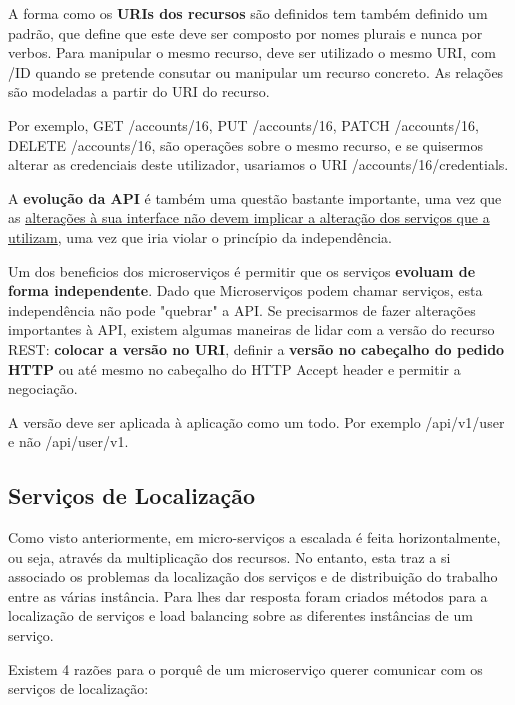 \documentclass{article}
\begin{document}
\vspace{2mm}

A forma como os \textbf{URIs dos recursos} são definidos tem também definido um padrão, que define
que este deve ser composto por nomes plurais e nunca por verbos. Para manipular o mesmo
recurso, deve ser utilizado o mesmo URI, com /ID quando se pretende consutar ou manipular
um recurso concreto. As relações são modeladas a partir do URI do recurso.

Por exemplo, GET /accounts/16, PUT /accounts/16,
PATCH /accounts/16, DELETE /accounts/16, são operações
sobre o mesmo recurso, e se quisermos alterar as credenciais
deste utilizador, usariamos o URI /accounts/16/credentials.

\vspace{2mm}

A \textbf{evolução da API} é também uma questão bastante importante, uma vez que as \uline{alterações à
sua interface não devem implicar a alteração dos serviços que a utilizam}, uma vez que iria
violar o princípio da independência.

Um dos beneficios dos microserviços é permitir que os serviços
\textbf{evoluam de forma independente}. Dado que Microserviços
podem chamar serviços, esta independência não pode
"quebrar" a API. Se precisarmos de fazer alterações importantes
à API, existem algumas maneiras de lidar com a versão do
recurso REST: \textbf{colocar a versão no URI}, definir a \textbf{versão no cabeçalho do pedido HTTP}
ou até mesmo no cabeçalho do HTTP Accept header e permitir a negociação.

A versão deve ser aplicada à aplicação como um todo. Por exemplo /api/v1/user e não /api/user/v1.

\subsection{Serviços de Localização}

Como visto anteriormente, em micro-serviços a escalada é feita horizontalmente, ou seja,
através da multiplicação dos recursos. No entanto, esta traz a si associado os problemas da
localização dos serviços e de distribuição do trabalho entre as várias instância. Para lhes dar
resposta foram criados métodos para a localização de serviços e
load balancing sobre as diferentes instâncias de um serviço.

\pagebreak

Existem 4 razões para o porquê de um microserviço querer
comunicar com os serviços de localização:
\end{document}
